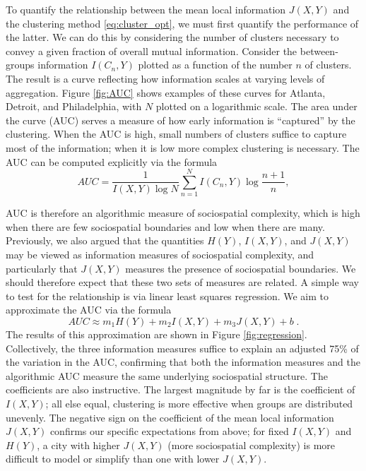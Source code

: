 \documentclass[9pt,twocolumn,twoside]{pnas-new}
\begin{document}
	To quantify the relationship between the mean local information $J(X,Y)$ and the clustering method \eqref{eq:cluster_opt}, we must first quantify the performance of the latter. We can do this by considering the number of clusters necessary to convey a given fraction of overall mutual information. Consider the between-groups information $I(C_n,Y)$ plotted as a function of the number $n$ of clusters. The result is a curve reflecting how information scales at varying levels of aggregation. Figure \ref{fig:AUC} shows examples of these curves for Atlanta, Detroit, and Philadelphia, with $N$ plotted on a logarithmic scale. The area under the curve (AUC) serves a measure of how early information is ``captured'' by the clustering. When the AUC is high, small numbers of clusters suffice to capture most of the information; when it is low more complex clustering is necessary. The AUC can be computed explicitly via the formula 
	\begin{equation}
		AUC = \frac{1}{I(X,Y) \log N} \sum_{n=1}^N I(C_n, Y) \log \frac{n+1}{n}, \label{eq:AUC_formula}
	\end{equation}

	AUC is therefore an algorithmic measure of sociospatial complexity, which is high when there are few sociospatial boundaries and low when there are many. Previously, we also argued that the quantities $H(Y)$, $I(X,Y)$, and $J(X,Y)$ may be viewed as information measures of sociospatial complexity, and particularly that $J(X,Y)$ measures the presence of sociospatial boundaries. We should therefore expect that these two sets of measures are related. A simple way to test for the relationship is via linear least squares regression. We aim to approximate the AUC via the formula
		\begin{equation*}
			AUC \approx m_1H(Y) + m_2I(X,Y) + m_3J(X,Y) + b\;.
		\end{equation*}
	The results of this approximation are shown in Figure \ref{fig:regression}. Collectively, the three information measures suffice to explain an adjusted 75\% of the variation in the AUC, confirming that both the information measures and the algorithmic AUC measure the same underlying sociospatial structure. The coefficients are also instructive. The largest magnitude by far is the coefficient of $I(X,Y)$; all else equal, clustering is more effective when groups are distributed unevenly. The negative sign on the coefficient of the mean local information $J(X,Y)$ confirms our specific expectations from above; for fixed $I(X,Y)$ and $H(Y)$, a city with higher $J(X,Y)$ (more sociospatial complexity) is more difficult to model or simplify than one with lower $J(X,Y)$. 
\end{document}
